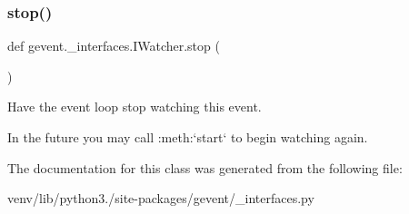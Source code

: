 \subsubsection{\texorpdfstring{stop()}{stop()}}
{\footnotesize\ttfamily def gevent.\+\_\+interfaces.\+I\+Watcher.\+stop (\begin{DoxyParamCaption}{ }\end{DoxyParamCaption})}

\begin{DoxyVerb}Have the event loop stop watching this event.

In the future you may call :meth:`start` to begin watching
again.
\end{DoxyVerb}
 

The documentation for this class was generated from the following file\+:\begin{DoxyCompactItemize}
\item 
venv/lib/python3./site-\/packages/gevent/\+\_\+interfaces.\+py\end{DoxyCompactItemize}
